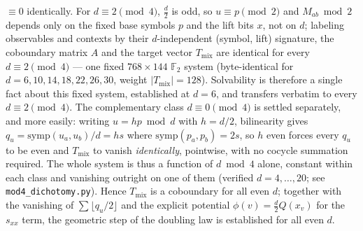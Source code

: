 \documentclass[11pt]{article}
\theoremstyle{remark}
\newcommand{\F}{\mathbb{F}}
\begin{document}
$\equiv 0$ identically. For $d\equiv 2\pmod 4$, $\tfrac d2$ is odd, so $u\equiv p\pmod 2$ and
$M_{ab}\bmod 2$ depends only on the fixed base symbols $p$ and the lift bits $x$, not on $d$; labeling
observables and contexts by their $d$-independent (symbol, lift) signature, the coboundary matrix $A$
and the target vector $T_{\mathrm{mix}}$ are identical for every $d\equiv 2\pmod 4$ --- one fixed
$768\times 144$ $\F_2$ system (byte-identical for $d=6,10,14,18,22,26,30$, weight
$|T_{\mathrm{mix}}|=128$). Solvability is therefore a single fact about this fixed system, established
at $d=6$, and transfers verbatim to every $d\equiv 2\pmod 4$.
The complementary class $d\equiv 0\pmod 4$ is settled separately, and more easily: writing
$u=hp \bmod d$ with $h=d/2$, bilinearity gives $q_u=\mathrm{symp}(u_a,u_b)/d=h s$ where
$\mathrm{symp}(p_a,p_b)=2s$, so $h$ even forces every $q_u$ to be even and $T_{\mathrm{mix}}$
to vanish \emph{identically}, pointwise, with no cocycle summation required. The whole system is
thus a function of $d\bmod 4$ alone, constant within each class and vanishing outright on one of
them (verified $d=4,\dots,20$; see \texttt{mod4\_dichotomy.py}).
Hence $T_{\mathrm{mix}}$ is a coboundary for all even $d$; together with the vanishing of $\sum\lfloor q_u/2\rfloor$ and the explicit potential
$\phi(v)=\tfrac d2 Q(x_v)$ for the $s_{xx}$ term, the geometric step of the doubling law is established
for all even $d$.
\end{document}
